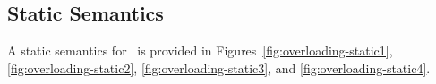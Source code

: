 %
%
%
%

\subsection{Static Semantics}\label{overloading-static}
A static semantics for \overloadingcore\ is provided in
Figures~\ref{fig:overloading-static1}, \ref{fig:overloading-static2},
\ref{fig:overloading-static3}, and \ref{fig:overloading-static4}.


